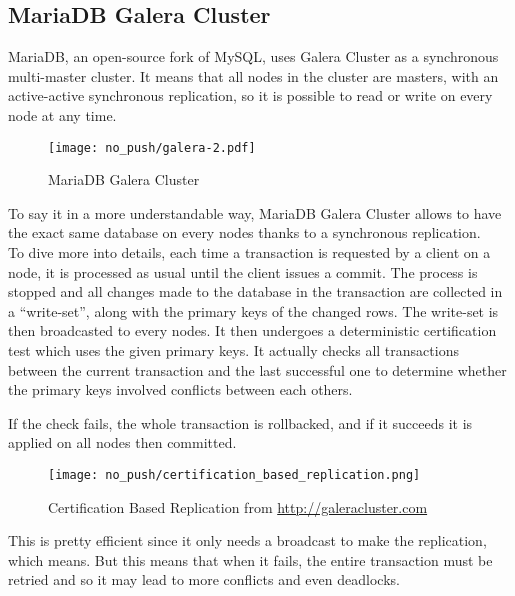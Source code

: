 \documentclass[a4paper, 10pt, titlepage]{report}
\begin{document}
\subsection{MariaDB Galera Cluster}

MariaDB, an open-source fork of MySQL, uses Galera Cluster as a synchronous multi-master cluster. It means that all nodes in the cluster are masters, with an active-active synchronous replication, so it is possible to read or write on every node at any time.

\begin{figure}[H]
  \vspace{-10pt}
  \centering
  \centerline{\texttt{[image: no\_push/galera-2.pdf]}}
  \vspace{-5pt}
  \caption{MariaDB Galera Cluster}
  \vspace{-5pt}
  \label{fig:MGC}
\end{figure}

To say it in a more understandable way, MariaDB Galera Cluster allows to have the exact same database on every nodes thanks to a synchronous replication.
\\

To dive more into details, each time a transaction is requested by a client on a node, it is processed as usual until the client issues a commit. The process is stopped and all changes made to the database in the transaction are collected in a ``write-set'', along with the primary keys of the changed rows. The write-set is then broadcasted to every nodes. It then undergoes a deterministic certification test which uses the given primary keys. It actually checks all transactions between the current transaction and the last successful one to determine whether the primary keys involved conflicts between each others.

If the check fails, the whole transaction is rollbacked, and if it succeeds it is applied on all nodes then committed.

\begin{figure}[H]
  \vspace{-10pt}
  \centering
  \centerline{\texttt{[image: no\_push/certification\_based\_replication.png]}}
  \vspace{-5pt}
  \caption{Certification Based Replication from \url{http://galeracluster.com} }
  \vspace{-5pt}
  \label{fig:MGC}
\end{figure}

This is pretty efficient since it only needs a broadcast to make the replication, which means. But this means that when it fails, the entire transaction must be retried and so it may lead to more conflicts and even deadlocks.
\end{document}
